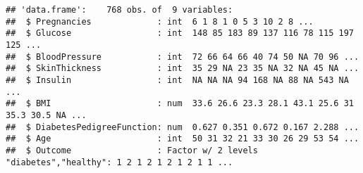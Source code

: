 \documentclass[
]{article}
\newenvironment{Shaded}{\begin{snugshade}}{\end{snugshade}}
\newcommand{\AttributeTok}[1]{\textcolor[rgb]{0.77,0.63,0.00}{#1}}
\newcommand{\CommentTok}[1]{\textcolor[rgb]{0.56,0.35,0.01}{\textit{#1}}}
\newcommand{\ConstantTok}[1]{\textcolor[rgb]{0.00,0.00,0.00}{#1}}
\newcommand{\ControlFlowTok}[1]{\textcolor[rgb]{0.13,0.29,0.53}{\textbf{#1}}}
\newcommand{\DecValTok}[1]{\textcolor[rgb]{0.00,0.00,0.81}{#1}}
\newcommand{\FunctionTok}[1]{\textcolor[rgb]{0.00,0.00,0.00}{#1}}
\newcommand{\NormalTok}[1]{#1}
\newcommand{\OtherTok}[1]{\textcolor[rgb]{0.56,0.35,0.01}{#1}}
\newcommand{\SpecialCharTok}[1]{\textcolor[rgb]{0.00,0.00,0.00}{#1}}
\newcommand{\StringTok}[1]{\textcolor[rgb]{0.31,0.60,0.02}{#1}}
\begin{document}
\begin{Shaded}
\end{Shaded}

\begin{verbatim}
## 'data.frame':    768 obs. of  9 variables:
##  $ Pregnancies             : int  6 1 8 1 0 5 3 10 2 8 ...
##  $ Glucose                 : int  148 85 183 89 137 116 78 115 197 125 ...
##  $ BloodPressure           : int  72 66 64 66 40 74 50 NA 70 96 ...
##  $ SkinThickness           : int  35 29 NA 23 35 NA 32 NA 45 NA ...
##  $ Insulin                 : int  NA NA NA 94 168 NA 88 NA 543 NA ...
##  $ BMI                     : num  33.6 26.6 23.3 28.1 43.1 25.6 31 35.3 30.5 NA ...
##  $ DiabetesPedigreeFunction: num  0.627 0.351 0.672 0.167 2.288 ...
##  $ Age                     : int  50 31 32 21 33 30 26 29 53 54 ...
##  $ Outcome                 : Factor w/ 2 levels "diabetes","healthy": 1 2 1 2 1 2 1 2 1 1 ...
\end{verbatim}
\end{document}
